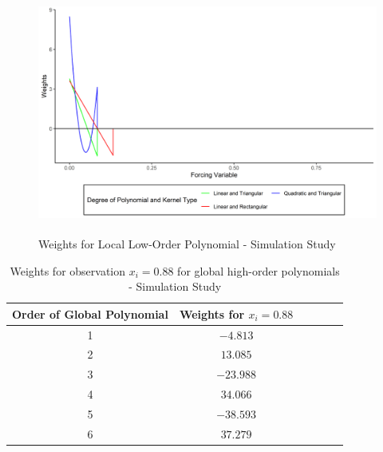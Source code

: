 \documentclass[fleqn]{article}
\begin{document}
    \begin{figure}[h]
        \centering
        \includegraphics[width = 15cm,height = 8cm]{arg1_sim_local.png}
        \caption{Weights for Local Low-Order Polynomial - Simulation Study}
        \label{fig:arg1_local}
    \end{figure}

    \begin{table}[htb]
    \centering
    \caption{Weights for observation $x_{i} = 0.88$ for global high-order polynomials - Simulation Study}
    \label{arg1_table_sim}
        \begin{tabular}{cccccc}\\
            \hline
            Order of Global Polynomial & Weights for $x_{i} = 0.88$\\
            \hline
            1 & $-4.813$\\
            2 & $13.085$\\
            3 & $-23.988$\\
            4 & $34.066$\\
            5 & $-38.593$\\
            6 & $37.279$\\
            \hline
        \end{tabular} 
    \end{table} 
\end{document}
